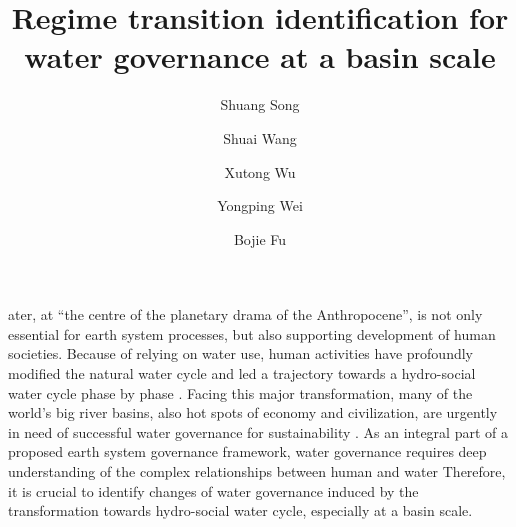 \documentclass[9pt, twocolumn, twoside, lineno]{pnas-new}
\title{Regime transition identification for water governance at a basin scale}
\author[a, b]{Shuang Song}  %
\author[a, b]{Shuai Wang}  %
\author[c, d]{Xutong Wu}  %
\author[e]{Yongping Wei} %
\author[a, b, 1]{Bojie Fu}  %
\affil[a]{ %
	State Key Laboratory of Earth Surface Processes and Resource Ecology, 
	Faculty of Geographical Science, 
	Beijing Normal University, 
	Beijing 100875, 
	P.R. China
}
\affil[b]{ %
	Institute of Land Surface System and Sustainability, 
	Faculty of Geographical Science, 
	Beijing Normal University, 
	Beijing 100875, 
	P.R. China
}
\affil[c]{ %
	College of Urban and Environmental Sciences, 
	Peking University, 
	Beijing 100871, 
	P.R. China
}
\affil[d]{ %
	State Key Laboratory of Urban and Regional Ecology, 
	Research Center for Eco-Environmental Sciences, 
	Chinese Academy of Sciences, 
	Beijing 100085, 
	P.R. China 
}
\affil[e]{ %
	School of Earth and Environmental Sciences, 
	The University of Queensland, 
	Brisbane 4067, 
	Australia
}
\begin{document}
\maketitle
\thispagestyle{firststyle}

\label{introduction-section-1}
ater, at “the centre of the planetary drama of the Anthropocene”, is not only essential for earth system processes, but also supporting development of human societies. 
Because of relying on water use, human activities have profoundly modified the natural water cycle and led a trajectory towards a hydro-social water cycle phase by phase
\cite{gleeson2020,sivapalan2012,qin2014,abbott2019,levia2020}.
Facing this major transformation, many of the world's big river basins, also hot spots of economy and civilization, are urgently in need of successful water governance for sustainability
\cite{bestAnthropogenicStressesWorld2019,falkenmark2019,dibaldassarre2019}. 
As an integral part of a proposed earth system governance framework, water governance requires deep understanding of the complex relationships between human and water
\cite{biermann2012,steffen2020,dibaldassarre2019}
Therefore, it is crucial to identify changes of water governance induced by the transformation towards hydro-social water cycle, especially at a basin scale.
\end{document}
